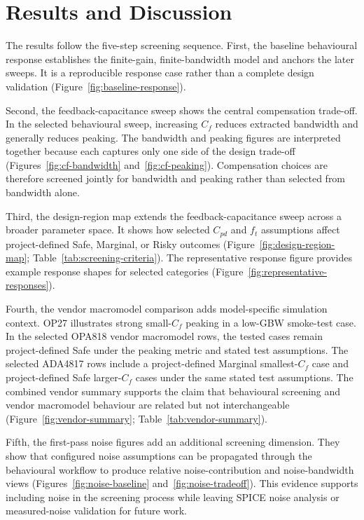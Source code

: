 \section{Results and Discussion}

The results follow the five-step screening sequence. First, the baseline behavioural response establishes the finite-gain, finite-bandwidth model and anchors the later sweeps. It is a reproducible response case rather than a complete design validation (Figure~\ref{fig:baseline-response}).

Second, the feedback-capacitance sweep shows the central compensation trade-off. In the selected behavioural sweep, increasing $C_f$ reduces extracted bandwidth and generally reduces peaking. The bandwidth and peaking figures are interpreted together because each captures only one side of the design trade-off (Figures~\ref{fig:cf-bandwidth} and~\ref{fig:cf-peaking}). Compensation choices are therefore screened jointly for bandwidth and peaking rather than selected from bandwidth alone.

Third, the design-region map extends the feedback-capacitance sweep across a broader parameter space. It shows how selected $C_{pd}$ and $f_t$ assumptions affect project-defined Safe, Marginal, or Risky outcomes (Figure~\ref{fig:design-region-map}; Table~\ref{tab:screening-criteria}). The representative response figure provides example response shapes for selected categories (Figure~\ref{fig:representative-responses}).

Fourth, the vendor macromodel comparison adds model-specific simulation context. OP27 illustrates strong small-$C_f$ peaking in a low-GBW smoke-test case. In the selected OPA818 vendor macromodel rows, the tested cases remain project-defined Safe under the peaking metric and stated test assumptions. The selected ADA4817 rows include a project-defined Marginal smallest-$C_f$ case and project-defined Safe larger-$C_f$ cases under the same stated test assumptions. The combined vendor summary supports the claim that behavioural screening and vendor macromodel behaviour are related but not interchangeable (Figure~\ref{fig:vendor-summary}; Table~\ref{tab:vendor-summary}).

Fifth, the first-pass noise figures add an additional screening dimension. They show that configured noise assumptions can be propagated through the behavioural workflow to produce relative noise-contribution and noise-bandwidth views (Figures~\ref{fig:noise-baseline} and~\ref{fig:noise-tradeoff}). This evidence supports including noise in the screening process while leaving SPICE noise analysis or measured-noise validation for future work.

